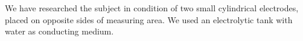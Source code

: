 \documentclass{article}
\begin{document}
We have researched the subject in condition of two small cylindrical electrodes, placed on opposite sides of measuring area. We used an electrolytic tank with water as conducting medium.






\end{document}
